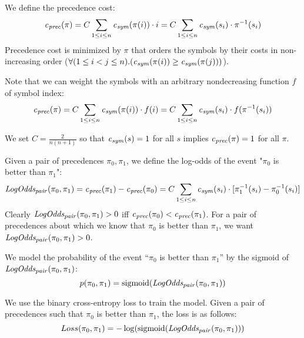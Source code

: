 We define the precedence cost:
$$
\CostPrec(\pi) =
C \sum_{1 \leq i \leq n} \CostSym(\pi(i)) \cdot i =
C \sum_{1 \leq i \leq n} \CostSym(s_i) \cdot \inv{\pi}(s_i)
$$
Precedence cost is minimized by $\pi$ that orders the symbols by their costs in non-increasing order
($\forall (1 \leq i < j \leq n) . (\CostSym(\pi(i)) \geq \CostSym(\pi(j)))$).

Note that we can weight the symbols with an arbitrary nondecreasing function $f$ of symbol index:
$$
\CostPrec(\pi) =
C \sum_{1 \leq i \leq n} \CostSym(\pi(i)) \cdot f(i) =
C \sum_{1 \leq i \leq n} \CostSym(s_i) \cdot f(\inv{\pi}(s_i))
$$

We set $C = \frac{2}{n(n+1)}$ so that $\CostSym(s) = 1$ for all $s$ implies $\CostPrec(\pi) = 1$ for all $\pi$.

Given a pair of precedences $\pi_0, \pi_1$,
we define the log-odds of the event "$\pi_0$ is better than $\pi_1$":
$$
\CostPrecPair(\pi_0, \pi_1) =
\CostPrec(\pi_1) - \CostPrec(\pi_0) =
C \sum_{1 \leq i \leq n} \CostSym(s_i) \cdot [\inv{\pi_1}(s_i) - \inv{\pi_0}(s_i)]
$$
Clearly $\CostPrecPair(\pi_0, \pi_1) > 0$ iff $\CostPrec(\pi_0) < \CostPrec(\pi_1)$.
For a pair of precedences about which we know that $\pi_0$ is better than $\pi_1$,
we want $\CostPrecPair(\pi_0, \pi_1) > 0$.

We model the probability of the event ``$\pi_0$ is better than $\pi_1$''
by the sigmoid of $\CostPrecPair(\pi_0, \pi_1)$:
$$
p(\pi_0, \pi_1) = \sigmoid(\CostPrecPair(\pi_0, \pi_1))
$$

We use the binary cross-entropy loss to train the model.
Given a pair of precedences such that $\pi_0$ is better than $\pi_1$,
the loss is as follows:
$$
Loss(\pi_0, \pi_1) = -\log(\sigmoid(\CostPrecPair(\pi_0, \pi_1)))
$$
